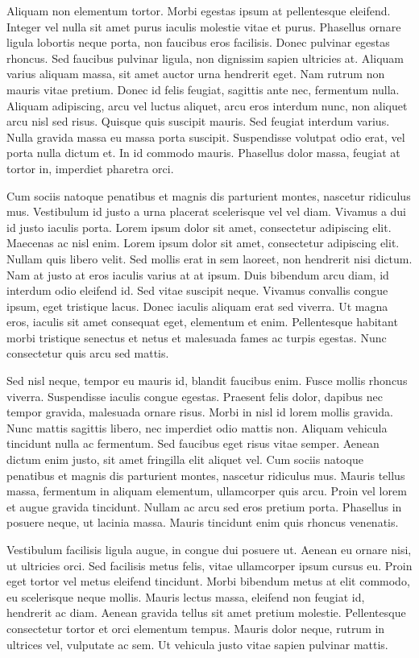 \documentclass[2pt,a4paper,twoside ]{article}
\begin{document}
\begin{multicols}{2}
Aliquam non elementum tortor. Morbi egestas ipsum at pellentesque eleifend. Integer vel nulla sit amet purus iaculis molestie vitae et purus. Phasellus ornare ligula lobortis neque porta, non faucibus eros facilisis. Donec pulvinar egestas rhoncus. Sed faucibus pulvinar ligula, non dignissim sapien ultricies at. Aliquam varius aliquam massa, sit amet auctor urna hendrerit eget. Nam rutrum non mauris vitae pretium. Donec id felis feugiat, sagittis ante nec, fermentum nulla. Aliquam adipiscing, arcu vel luctus aliquet, arcu eros interdum nunc, non aliquet arcu nisl sed risus. Quisque quis suscipit mauris. Sed feugiat interdum varius. Nulla gravida massa eu massa porta suscipit. Suspendisse volutpat odio erat, vel porta nulla dictum et. In id commodo mauris. Phasellus dolor massa, feugiat at tortor in, imperdiet pharetra orci.

Cum sociis natoque penatibus et magnis dis parturient montes, nascetur ridiculus mus. Vestibulum id justo a urna placerat scelerisque vel vel diam. Vivamus a dui id justo iaculis porta. Lorem ipsum dolor sit amet, consectetur adipiscing elit. Maecenas ac nisl enim. Lorem ipsum dolor sit amet, consectetur adipiscing elit. Nullam quis libero velit. Sed mollis erat in sem laoreet, non hendrerit nisi dictum. Nam at justo at eros iaculis varius at at ipsum. Duis bibendum arcu diam, id interdum odio eleifend id. Sed vitae suscipit neque. Vivamus convallis congue ipsum, eget tristique lacus. Donec iaculis aliquam erat sed viverra. Ut magna eros, iaculis sit amet consequat eget, elementum et enim. Pellentesque habitant morbi tristique senectus et netus et malesuada fames ac turpis egestas. Nunc consectetur quis arcu sed mattis.

Sed nisl neque, tempor eu mauris id, blandit faucibus enim. Fusce mollis rhoncus viverra. Suspendisse iaculis congue egestas. Praesent felis dolor, dapibus nec tempor gravida, malesuada ornare risus. Morbi in nisl id lorem mollis gravida. Nunc mattis sagittis libero, nec imperdiet odio mattis non. Aliquam vehicula tincidunt nulla ac fermentum. Sed faucibus eget risus vitae semper. Aenean dictum enim justo, sit amet fringilla elit aliquet vel. Cum sociis natoque penatibus et magnis dis parturient montes, nascetur ridiculus mus. Mauris tellus massa, fermentum in aliquam elementum, ullamcorper quis arcu. Proin vel lorem et augue gravida tincidunt. Nullam ac arcu sed eros pretium porta. Phasellus in posuere neque, ut lacinia massa. Mauris tincidunt enim quis rhoncus venenatis.

Vestibulum facilisis ligula augue, in congue dui posuere ut. Aenean eu ornare nisi, ut ultricies orci. Sed facilisis metus felis, vitae ullamcorper ipsum cursus eu. Proin eget tortor vel metus eleifend tincidunt. Morbi bibendum metus at elit commodo, eu scelerisque neque mollis. Mauris lectus massa, eleifend non feugiat id, hendrerit ac diam. Aenean gravida tellus sit amet pretium molestie. Pellentesque consectetur tortor et orci elementum tempus. Mauris dolor neque, rutrum in ultrices vel, vulputate ac sem. Ut vehicula justo vitae sapien pulvinar mattis.


\end{multicols}
\end{document}
